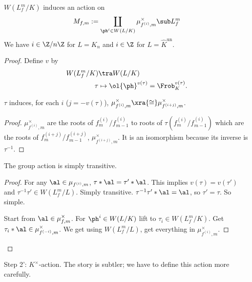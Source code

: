 \begin{pr}
$W(L_f^m/K)$ induces an action on
\[
M_{f,m}:=\coprod_{\ph^i\in W(L/K)} \mu^{\times}_{f^{(i)},m}\sub L_f^m
\]
We have $i\in \Z/n\Z$ for $L=K_n$ and $i\in \Z$ for $L=\hat{K}^{\text{un}}$.
\end{pr}
\begin{proof}
Define $v$ by 
\begin{align*}
W(L_f^m/K)&\tra W(L/K)\\
\tau&\mapsto \ol{\ph}^{v(\tau)}=\Frob_K^{v(\tau)}.
\end{align*}
\begin{lem}
$\tau$ induces, for each $i$ ($j=-v(\tau)$), $\mu^{\times}_{f^{(i)},m}\xra{\cong} \mu_{f^{(i+j)},m}^{\times}$.
\end{lem}
\begin{proof}
$\mu_{f^{(i)},m}^{\times}$ are the roots of $f_m^{(i)}/f_{m-1}^{(i)}$ to roots of $\tau(f_m^{(i)}/f_{m-1}^{(i)})$
which are the roots of $f_m^{(i+j)}/f_{m-1}^{(i+j)}$, 
$\mu^{\times}_{f^{(i+j)},m}$. It is an isomorphism because its inverse is $\tau^{-1}$.
\end{proof}
\begin{lem}
The group action is simply transitive. 
\end{lem}
\begin{proof}
For any $\al\in \mu_{f^{(i)},m}$, $\tau*\al=\tau'*\al$. This implies $v(\tau)=v(\tau')$ and $\tau^{-1}\tau'\in W(L_f^m/L)$. Simply transitive. $\tau^{-1}\tau'*\al=\al$, so $\tau'=\tau$. So simple.

Start from $\al\in \mu_{f,m}^{\times}$. For $\ph^i\in W(L/K)$ lift to $\tau_i\in W(L_f^m/K)$. Get $\tau_i*\al\in \mu_{f^{(-i)},m}^{\times}$. We get using $W(L_f^m/L)$, get everything in $\mu^{\times}_{f^{(i)},m}$.
\end{proof}
\end{proof}
Step 2': $K^{\times}$-action. The story is subtler; we have to define this action more carefully.

